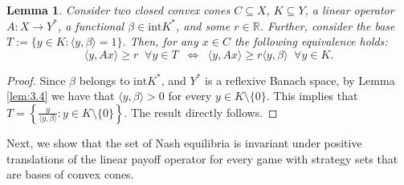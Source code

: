 \documentclass[11pt, twoside]{article}
\numberwithin{equation}{section}
\newtheorem{lemma}{Lemma}[section]
\theoremstyle{definition}
\begin{document}
\begin{lemma}\label{lem:3.5}
    Consider two closed convex cones $C\subseteq X$, $K\subseteq Y$, a linear operator $A:X\to Y^*$, a functional $\beta \in \text{int}K^*$, and some $r\in\mathbb{R}$. Further, consider the base $T:= \{y\in K:\langle y,\beta\rangle=1\}$. Then, for any $x\in C$ the following equivalence holds:
    \begin{equation*}
        \langle y,Ax\rangle\geq r\;\;\forall y\in T \;\;\Longleftrightarrow\;\;\langle y,Ax\rangle\geq r\langle y,\beta\rangle\;\;\forall y\in K.
    \end{equation*}
\end{lemma}
\begin{proof}
    Since $\beta$ belongs to $\text{int} K^*$, and $Y^*$ is a reflexive Banach space, by Lemma \ref{lem:3.4} we have that $\langle y,\beta\rangle >0$ for every $y\in K\setminus\{0\}$. This implies that $T=\left\{\frac{y}{\langle y,\beta\rangle}: y\in K\setminus\{0\}\right\}$. The result directly follows.
\end{proof}

Next, we show that the set of Nash equilibria is invariant under positive translations of the linear payoff operator for every game with strategy sets that are bases of convex cones.
\end{document}
